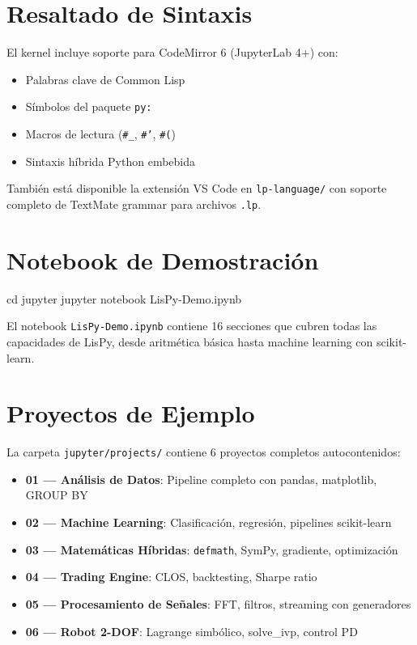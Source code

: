 \section{Resaltado de Sintaxis}

El kernel incluye soporte para CodeMirror 6 (JupyterLab 4+) con:
\begin{itemize}
\item Palabras clave de Common Lisp
\item Símbolos del paquete \texttt{py:}
\item Macros de lectura (\texttt{\#\_}, \texttt{\#'}, \texttt{\#(})
\item Sintaxis híbrida Python embebida
\end{itemize}

También está disponible la extensión VS Code en \texttt{lp-language/} con soporte
completo de TextMate grammar para archivos \texttt{.lp}.

\section{Notebook de Demostración}

\begin{lispcode}
cd jupyter
jupyter notebook LisPy-Demo.ipynb
\end{lispcode}

El notebook \texttt{LisPy-Demo.ipynb} contiene 16 secciones que cubren todas las
capacidades de LisPy, desde aritmética básica hasta machine learning con
scikit-learn.

\section{Proyectos de Ejemplo}

La carpeta \texttt{jupyter/projects/} contiene 6 proyectos completos autocontenidos:
\begin{itemize}
\item \textbf{01 — Análisis de Datos}: Pipeline completo con pandas, matplotlib, GROUP BY
\item \textbf{02 — Machine Learning}: Clasificación, regresión, pipelines scikit-learn
\item \textbf{03 — Matemáticas Híbridas}: \texttt{defmath}, SymPy, gradiente, optimización
\item \textbf{04 — Trading Engine}: CLOS, backtesting, Sharpe ratio
\item \textbf{05 — Procesamiento de Señales}: FFT, filtros, streaming con generadores
\item \textbf{06 — Robot 2-DOF}: Lagrange simbólico, solve\_ivp, control PD
\end{itemize}

